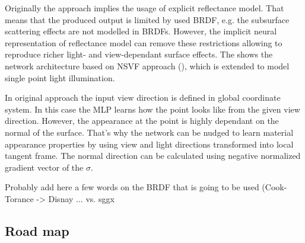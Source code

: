 \documentclass[english]{article}
\newcommand{\rphr}[1]{{\color{blue}#1}}
\begin{document}
Originally the approach implies the usage of explicit reflectance model.
That means that the produced output is limited by used BRDF, e.g. the subsurface scattering effects are not modelled in BRDFs.
However, the implicit neural representation of reflectance model can remove these restrictions allowing to reproduce richer light- and view-dependant surface effects. The  shows the network architecture based on NSVF approach (\cite{nsvf2020}), which is extended to model single point light illumination.

In original approach the input view direction is defined in global coordinate system.
In this case the MLP learns how the point looks like from the given view direction.
However, the appearance at the point is highly dependant on the normal of the surface.
That's why the network can be nudged to learn material appearance properties by using view and light directions transformed into local tangent frame.
The normal direction can be calculated using negative normalized gradient vector of the $\sigma$.

\rphr{Probably add here a few words on the BRDF that is going to be used (Cook-Torance -> Disnay ... vs. sggx}


\subsection{Road map}
\label{roadmap}
\end{document}
